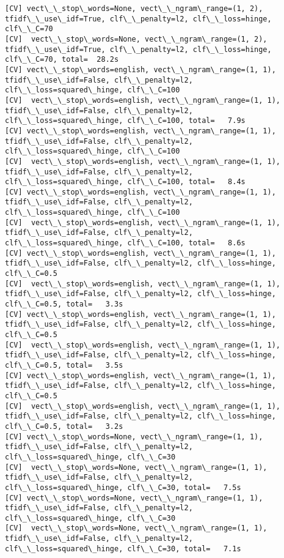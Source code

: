 \documentclass[11pt]{article}
\begin{document}
\begin{Verbatim}[commandchars=\\\{\}]
[CV] vect\_\_stop\_words=None, vect\_\_ngram\_range=(1, 2), tfidf\_\_use\_idf=True, clf\_\_penalty=l2, clf\_\_loss=hinge, clf\_\_C=70 
[CV]  vect\_\_stop\_words=None, vect\_\_ngram\_range=(1, 2), tfidf\_\_use\_idf=True, clf\_\_penalty=l2, clf\_\_loss=hinge, clf\_\_C=70, total=  28.2s
[CV] vect\_\_stop\_words=english, vect\_\_ngram\_range=(1, 1), tfidf\_\_use\_idf=False, clf\_\_penalty=l2, clf\_\_loss=squared\_hinge, clf\_\_C=100 
[CV]  vect\_\_stop\_words=english, vect\_\_ngram\_range=(1, 1), tfidf\_\_use\_idf=False, clf\_\_penalty=l2, clf\_\_loss=squared\_hinge, clf\_\_C=100, total=   7.9s
[CV] vect\_\_stop\_words=english, vect\_\_ngram\_range=(1, 1), tfidf\_\_use\_idf=False, clf\_\_penalty=l2, clf\_\_loss=squared\_hinge, clf\_\_C=100 
[CV]  vect\_\_stop\_words=english, vect\_\_ngram\_range=(1, 1), tfidf\_\_use\_idf=False, clf\_\_penalty=l2, clf\_\_loss=squared\_hinge, clf\_\_C=100, total=   8.4s
[CV] vect\_\_stop\_words=english, vect\_\_ngram\_range=(1, 1), tfidf\_\_use\_idf=False, clf\_\_penalty=l2, clf\_\_loss=squared\_hinge, clf\_\_C=100 
[CV]  vect\_\_stop\_words=english, vect\_\_ngram\_range=(1, 1), tfidf\_\_use\_idf=False, clf\_\_penalty=l2, clf\_\_loss=squared\_hinge, clf\_\_C=100, total=   8.6s
[CV] vect\_\_stop\_words=english, vect\_\_ngram\_range=(1, 1), tfidf\_\_use\_idf=False, clf\_\_penalty=l2, clf\_\_loss=hinge, clf\_\_C=0.5 
[CV]  vect\_\_stop\_words=english, vect\_\_ngram\_range=(1, 1), tfidf\_\_use\_idf=False, clf\_\_penalty=l2, clf\_\_loss=hinge, clf\_\_C=0.5, total=   3.3s
[CV] vect\_\_stop\_words=english, vect\_\_ngram\_range=(1, 1), tfidf\_\_use\_idf=False, clf\_\_penalty=l2, clf\_\_loss=hinge, clf\_\_C=0.5 
[CV]  vect\_\_stop\_words=english, vect\_\_ngram\_range=(1, 1), tfidf\_\_use\_idf=False, clf\_\_penalty=l2, clf\_\_loss=hinge, clf\_\_C=0.5, total=   3.5s
[CV] vect\_\_stop\_words=english, vect\_\_ngram\_range=(1, 1), tfidf\_\_use\_idf=False, clf\_\_penalty=l2, clf\_\_loss=hinge, clf\_\_C=0.5 
[CV]  vect\_\_stop\_words=english, vect\_\_ngram\_range=(1, 1), tfidf\_\_use\_idf=False, clf\_\_penalty=l2, clf\_\_loss=hinge, clf\_\_C=0.5, total=   3.2s
[CV] vect\_\_stop\_words=None, vect\_\_ngram\_range=(1, 1), tfidf\_\_use\_idf=False, clf\_\_penalty=l2, clf\_\_loss=squared\_hinge, clf\_\_C=30 
[CV]  vect\_\_stop\_words=None, vect\_\_ngram\_range=(1, 1), tfidf\_\_use\_idf=False, clf\_\_penalty=l2, clf\_\_loss=squared\_hinge, clf\_\_C=30, total=   7.5s
[CV] vect\_\_stop\_words=None, vect\_\_ngram\_range=(1, 1), tfidf\_\_use\_idf=False, clf\_\_penalty=l2, clf\_\_loss=squared\_hinge, clf\_\_C=30 
[CV]  vect\_\_stop\_words=None, vect\_\_ngram\_range=(1, 1), tfidf\_\_use\_idf=False, clf\_\_penalty=l2, clf\_\_loss=squared\_hinge, clf\_\_C=30, total=   7.1s

\end{Verbatim}
\end{document}
